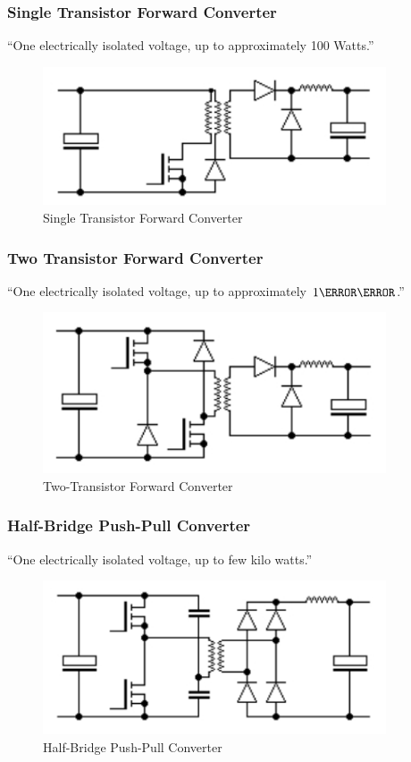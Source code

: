\subsubsection{Single Transistor Forward Converter} 
``One electrically isolated voltage, up to approximately 100 Watts.''\cite{SMPSD}
\begin{figure}[H]
\begin{center}
\includegraphics[width=4in]{includes/SingleTransistorFC}
\caption{Single Transistor Forward Converter}
\end{center}
\end{figure}


\subsubsection{Two Transistor Forward Converter}
 ``One electrically isolated voltage, up to approximately $1\kilo\watt$.''\cite{SMPSD}
\begin{figure}[H]
\begin{center}
\includegraphics[width=4in]{includes/TwoTransistorFC}
\caption{Two-Transistor Forward Converter}
\end{center}
\end{figure}

\subsubsection{Half-Bridge Push-Pull Converter}
 ``One electrically isolated voltage, up to few kilo watts.''\cite{SMPSD}
\begin{figure}[H]
\begin{center}
\includegraphics[width=4in]{includes/HalfBridgePushPullC}
\caption{Half-Bridge Push-Pull Converter}
\end{center}
\end{figure}

